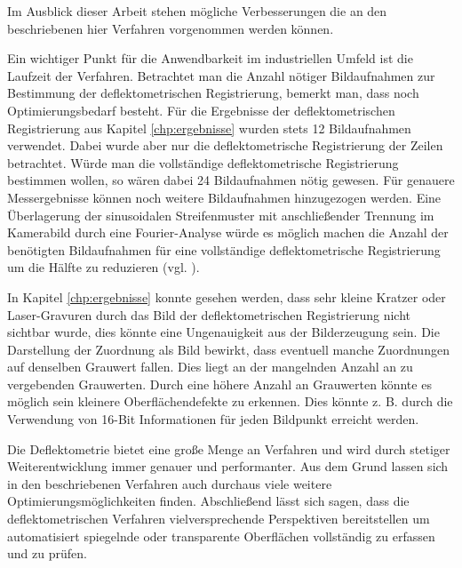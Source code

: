 Im Ausblick dieser Arbeit stehen mögliche Verbesserungen die an den beschriebenen hier Verfahren vorgenommen werden können.

\p
Ein wichtiger Punkt für die Anwendbarkeit im industriellen Umfeld ist die Laufzeit der Verfahren.
Betrachtet man die Anzahl nötiger Bildaufnahmen zur Bestimmung der deflektometrischen Registrierung, bemerkt man, dass noch Optimierungsbedarf besteht.
Für die Ergebnisse der deflektometrischen Registrierung aus Kapitel \ref{chp:ergebnisse} wurden stets 12 Bildaufnahmen verwendet.
Dabei wurde aber nur die deflektometrische Registrierung der Zeilen betrachtet.
Würde man die vollständige deflektometrische Registrierung bestimmen wollen, so wären dabei 24 Bildaufnahmen nötig gewesen.
Für genauere Messergebnisse können noch weitere Bildaufnahmen hinzugezogen werden.
Eine Überlagerung der sinusoidalen Streifenmuster mit anschließender Trennung im Kamerabild durch eine Fourier-Analyse würde es möglich machen die Anzahl der benötigten Bildaufnahmen für eine vollständige deflektometrische Registrierung um die Hälfte zu reduzieren (vgl. \cite{waveletPMD}).

\p
In Kapitel \ref{chp:ergebnisse} konnte gesehen werden, dass sehr kleine Kratzer oder Laser-Gravuren durch das Bild der deflektometrischen Registrierung nicht sichtbar wurde, dies könnte eine Ungenauigkeit aus der Bilderzeugung sein.
Die Darstellung der Zuordnung als Bild bewirkt, dass eventuell manche Zuordnungen auf denselben Grauwert fallen.
Dies liegt an der mangelnden Anzahl an zu vergebenden Grauwerten.
Durch eine höhere Anzahl an Grauwerten könnte es möglich sein kleinere Oberflächendefekte zu erkennen.
Dies könnte z. B. durch die Verwendung von 16-Bit Informationen für jeden Bildpunkt erreicht werden.

\p
Die Deflektometrie bietet eine große Menge an Verfahren und wird durch stetiger Weiterentwicklung immer genauer und performanter.
Aus dem Grund lassen sich in den beschriebenen Verfahren auch durchaus viele weitere Optimierungsmöglichkeiten finden.
Abschließend lässt sich sagen, dass die deflektometrischen Verfahren vielversprechende Perspektiven bereitstellen um automatisiert spiegelnde oder transparente Oberflächen vollständig zu erfassen und zu prüfen.